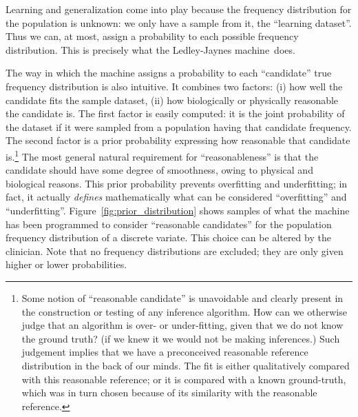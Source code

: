 \documentclass[utf8]{FrontiersinHarvard} %
\renewcommand*{\|}[1][]{\nonscript\:#1\vert\nonscript\:\mathopen{}}
\newcommand*{\ljm}{Ledley-Jaynes machine}
\begin{document}
Learning and generalization come into play because the frequency distribution for the population is unknown: we only have a sample from it, the \enquote{learning dataset}. Thus we can, at most, assign a probability to each possible frequency distribution. This is precisely what the \ljm\ does.

The way in which the machine assigns a probability to each \enquote{candidate} true frequency distribution is also intuitive. It combines two factors: (i) how well the candidate fits the sample dataset, (ii) how biologically or physically reasonable the candidate is. The first factor is easily computed: it is the joint probability of the dataset if it were sampled from a population having that candidate frequency. The second factor is a prior probability expressing how reasonable that candidate is.\footnote{Some notion of \enquote{reasonable candidate} is unavoidable and clearly present in the construction or testing of any inference algorithm. How can we otherwise judge that an algorithm is over- or under-fitting, given that we do not know the ground truth? (if we knew it we would not be making inferences.) Such judgement implies that we have a preconceived reasonable reference distribution in the back of our minds. The fit is either qualitatively compared with this reasonable reference; or it is compared with a known ground-truth, which was in turn chosen because of its similarity with the reasonable reference.} The most general natural requirement for \enquote{reasonableness} is that the candidate should have some degree of smoothness, owing to physical and biological reasons. This prior probability prevents overfitting and underfitting; in fact, it actually \emph{defines} mathematically what can be considered \enquote{overfitting} and \enquote{underfitting}. Figure~\ref{fig:prior_distribution} shows samples of what the machine has been programmed to consider \enquote{reasonable candidates} for the population frequency distribution of a discrete variate. This choice can be altered by the clinician. Note that no frequency distributions are excluded; they are only given higher or lower probabilities.
\end{document}
